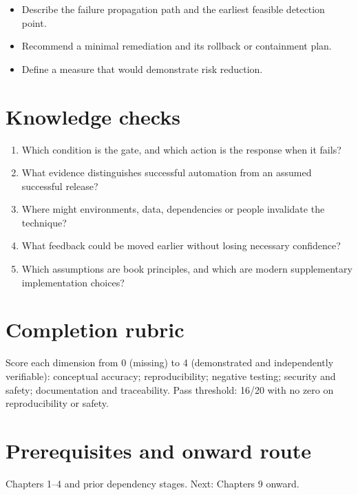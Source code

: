 \documentclass[10pt,letterpaper]{article}
\begin{document}
\begin{itemize}
\item Describe the failure propagation path and the earliest feasible detection point.
\item Recommend a minimal remediation and its rollback or containment plan.
\item Define a measure that would demonstrate risk reduction.
\end{itemize}

\section{Knowledge checks}
\begin{enumerate}
\item Which condition is the gate, and which action is the response when it fails?
\item What evidence distinguishes successful automation from an assumed successful release?
\item Where might environments, data, dependencies or people invalidate the technique?
\item What feedback could be moved earlier without losing necessary confidence?
\item Which assumptions are book principles, and which are modern supplementary implementation choices?
\end{enumerate}

\section{Completion rubric}
Score each dimension from 0 (missing) to 4 (demonstrated and independently verifiable): conceptual accuracy; reproducibility; negative testing; security and safety; documentation and traceability. Pass threshold: 16/20 with no zero on reproducibility or safety.


\section{Prerequisites and onward route}
Chapters 1--4 and prior dependency stages. Next: Chapters 9 onward.
\end{document}
